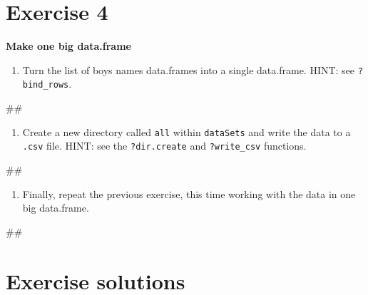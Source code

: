 \documentclass[]{book}
\newenvironment{Shaded}{\begin{snugshade}}{\end{snugshade}}
\newcommand{\NormalTok}[1]{#1}
\providecommand{\tightlist}{%
  \setlength{\itemsep}{0pt}\setlength{\parskip}{0pt}}
\begin{document}
\section{Exercise 4}\label{exercise-4-1}

\textbf{Make one big data.frame}

\begin{enumerate}
\def\labelenumi{\arabic{enumi}.}
\tightlist
\item
  Turn the list of boys names data.frames into a single data.frame.
  HINT: see \texttt{?bind\_rows}.
\end{enumerate}

\begin{Shaded}
\begin{Highlighting}[]
\NormalTok{## }
\end{Highlighting}
\end{Shaded}

\begin{enumerate}
\def\labelenumi{\arabic{enumi}.}
\setcounter{enumi}{1}
\tightlist
\item
  Create a new directory called \texttt{all} within \texttt{dataSets}
  and write the data to a \texttt{.csv} file. HINT: see the
  \texttt{?dir.create} and \texttt{?write\_csv} functions.
\end{enumerate}

\begin{Shaded}
\begin{Highlighting}[]
\NormalTok{## }
\end{Highlighting}
\end{Shaded}

\begin{enumerate}
\def\labelenumi{\arabic{enumi}.}
\setcounter{enumi}{2}
\tightlist
\item
  Finally, repeat the previous exercise, this time working with the data
  in one big data.frame.
\end{enumerate}

\begin{Shaded}
\begin{Highlighting}[]
\NormalTok{## }
\end{Highlighting}
\end{Shaded}

\section{Exercise solutions}\label{exercise-solutions-3}
\end{document}
